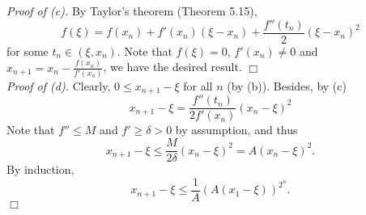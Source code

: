 \documentclass{article}
\begin{document}
\emph{Proof of (c).}
By Taylor's theorem (Theorem 5.15),
\[
        f(\xi) = f(x_n) + f'(x_n)(\xi - x_n) + \frac{f''(t_n)}{2}(\xi - x_n)^2
\]
for some $t_n \in (\xi, x_n)$.
Note that $f(\xi) = 0$, $f'(x_n) \neq 0$ and $x_{n+1} = x_n - \frac{f(x_n)}{f'(x_n)}$,
we have the desired result.
$\Box$ \\



\emph{Proof of (d).}
Clearly, $0 \leq x_{n+1} - \xi$ for all $n$ (by (b)).
Besides, by (c)
\[
  x_{n+1} - \xi = \frac{f''(t_n)}{2 f'(x_n)} (x_n-\xi)^2
\]
Note that $f'' \leq M$ and $f' \geq \delta > 0$ by assumption, and thus
\[
  x_{n+1} - \xi
  \leq \frac{M}{2\delta} (x_n - \xi)^2 = A (x_n - \xi)^2.
\]
By induction,
\[
  x_{n+1} - \xi \leq \frac{1}{A}(A(x_1-\xi))^{2^n}.
\]
$\Box$ \\
\end{document}
